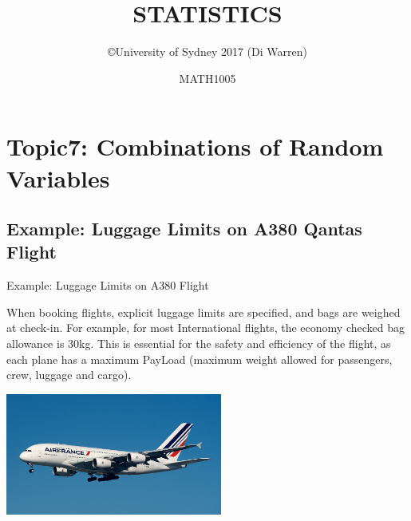 \documentclass[t,xcolor=pdftex,dvipsnames,table]{beamer}
\title{\Huge STATISTICS}
\subtitle{}
\author{\copyright University of Sydney 2017 (Di Warren)}
\date{MATH1005}
\begin{document}
\section[7]{Topic7: Combinations of Random Variables}

\subsection[Example: Luggage Limits on A380 Flight]{Example: Luggage Limits on A380 Qantas Flight}

\begin{frame}[fragile]{Example: Luggage Limits on A380 Flight}

When booking flights, explicit luggage limits are specified, and bags are weighed at check-in. For example, for most International flights, the economy checked bag allowance is 30kg. This is essential for the safety and efficiency of the flight, as each plane has a maximum PayLoad (maximum weight allowed for passengers, crew, luggage and cargo).
\href{http://www.qantas.com/travel/airlines/checked-baggage/global/en#international-flights-excluding-north-and-south-america}{}

\begin{center}
\includegraphics[height=4cm]{../images/A380.jpg}
\end{center}
\end{frame}
\end{document}
